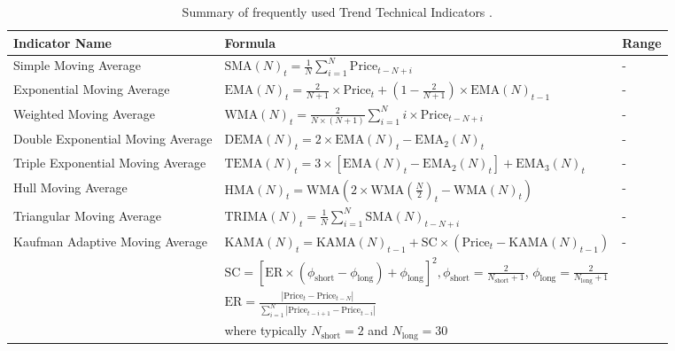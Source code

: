 \begin{table}[htb!]
\caption{Summary of frequently used Trend Technical Indicators \cite{jansen_machine_2020}.}
\label{Tables:TrendIndicators}
\centering
\footnotesize
\begin{tabularx}{\textwidth}{@{}lXl@{}}
\toprule
\textbf{Indicator Name} & \textbf{Formula} & \textbf{Range} \\ 
\midrule
Simple Moving Average & $\text{SMA}(N)_t = \frac{1}{N} \sum_{i=1}^{N} \text{Price}_{t-N+i}$ & - \\
\addlinespace
Exponential Moving Average & $\text{EMA}(N)_t = \frac{2}{N+1} \times \text{Price}_t + (1 - \frac{2}{N+1}) \times \text{EMA}(N)_{t-1}$ & - \\
\addlinespace
Weighted Moving Average & $\text{WMA}(N)_t = \frac{2}{N \times (N + 1)} \sum_{i=1}^{N} i \times \text{Price}_{t-N+i}$ & - \\
\addlinespace
Double Exponential Moving Average & $\text{DEMA}(N)_t = 2 \times \text{EMA}(N)_t - \text{EMA}_2(N)_t$ & - \\
\addlinespace
Triple Exponential Moving Average & $\text{TEMA}(N)_t = 3 \times [\text{EMA}(N)_t - \text{EMA}_2(N)_t] + \text{EMA}_3(N)_t$ & - \\
\addlinespace
Hull Moving Average & $\text{HMA}(N)_t = \text{WMA}\left(2 \times \text{WMA}\left(\frac{N}{2}\right)_t - \text{WMA}(N)_t\right)$ & - \\
\addlinespace
Triangular Moving Average & $\text{TRIMA}(N)_t = \frac{1}{N} \sum_{i=1}^{N} \text{SMA}(N)_{t-N+i}$ & - \\
\addlinespace
Kaufman Adaptive Moving Average & $\text{KAMA}(N)_t = \text{KAMA}(N)_{t-1} + \text{SC} \times (\text{Price}_t - \text{KAMA}(N)_{t-1})$ & - \\
\addlinespace
& $\text{SC} = [ \text{ER} \times (\phi_{\text{short}} - \phi_{\text{long}}) + \phi_{\text{long}} ]^2, \phi_{\text{short}} = \frac{2}{N_{\text{short}} + 1}$, $\phi_{\text{long}} = \frac{2}{N_{\text{long}} + 1}$ & \\
\addlinespace
& $\text{ER} = \frac{| \text{Price}_t - \text{Price}_{t-N} |}{\sum_{i=1}^{N} | \text{Price}_{t-i+1} - \text{Price}_{t-i} |}$ & \\
\addlinespace
& where typically $N_{\text{short}} = 2$ and $N_{\text{long}} = 30$ & \\
\bottomrule
\end{tabularx}
\end{table}
